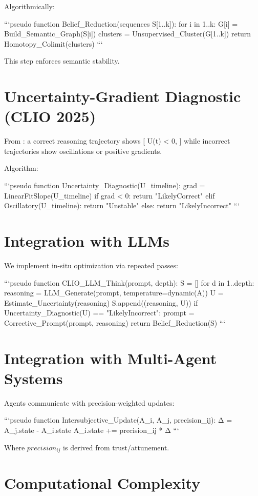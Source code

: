 \documentclass[12pt,oneside]{book}
\theoremstyle{plain}
\theoremstyle{definition}
\begin{document}
Algorithmically:

```pseudo
function Belief_Reduction(sequences S[1..k]):
    for i in 1..k:
        G[i] = Build_Semantic_Graph(S[i])
    clusters = Unsupervised_Cluster(G[1..k])
    return Homotopy_Colimit(clusters)
```

This step enforces semantic stability.

\section{Uncertainty-Gradient Diagnostic (CLIO 2025)}

From \textcite{Cheng2025CognitiveLV}:
a correct reasoning trajectory shows
[
 U(t) < 0,
]
while incorrect trajectories show oscillations or positive gradients.

Algorithm:

```pseudo
function Uncertainty_Diagnostic(U_timeline):
    grad = LinearFitSlope(U_timeline)
    if grad < 0:
        return "LikelyCorrect"
    elif Oscillatory(U_timeline):
        return "Unstable"
    else:
        return "LikelyIncorrect"
```

\section{Integration with LLMs}

We implement in-situ optimization via repeated passes:

```pseudo
function CLIO_LLM_Think(prompt, depth):
    S = []
    for d in 1..depth:
        reasoning = LLM_Generate(prompt, temperature=dynamic(A))
        U         = Estimate_Uncertainty(reasoning)
        S.append((reasoning, U))
        if Uncertainty_Diagnostic(U) == "LikelyIncorrect":
            prompt = Corrective_Prompt(prompt, reasoning)
    return Belief_Reduction(S)
```

\section{Integration with Multi-Agent Systems}

Agents communicate with precision-weighted updates:

```pseudo
function Intersubjective_Update(A_i, A_j, precision_ij):
    Δ = A_j.state - A_i.state
    A_i.state += precision_ij * Δ
```

Where $precision_{ij}$ is derived from trust/attunement.

\section{Computational Complexity}
\end{document}
